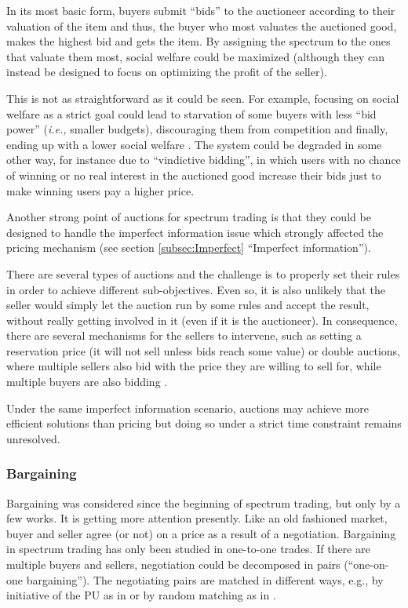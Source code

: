In its most basic form, buyers submit ``bids'' to the auctioneer according to their valuation of the item and thus, the buyer who most valuates the auctioned good, makes the highest bid and gets the item. By assigning the spectrum to the ones that valuate them most, social welfare could be maximized (although they can instead be designed to focus on optimizing the profit of the seller). 

This is not as straightforward as it could be seen. For example, focusing on social welfare as a strict goal could lead to starvation of some buyers with less ``bid power'' (\textit{i.e.,} smaller budgets), discouraging them from competition and finally, ending up with a lower social welfare \cite{ref:Gopinathan2011}. The system could be degraded in some other way, for instance due to ``vindictive bidding'', in which users with no chance of winning or no real interest in the auctioned good increase their bids just to make winning users pay a higher price. 

Another strong point of auctions for spectrum trading is that they could be designed to handle the imperfect information issue which strongly affected the pricing mechanism (see section \ref{subsec:Imperfect} ``Imperfect information'').

There are several types of auctions and the challenge is to properly set their rules in order to achieve different sub-objectives. Even so, it is also unlikely that the seller would simply let the auction run by some rules and accept the result, without really getting involved in it (even if it is the auctioneer). In consequence, there are several mechanisms for the sellers to intervene, such as setting a reservation price (it will not sell unless bids reach some value) or double auctions, where multiple sellers also bid with the price they are willing to sell for, while multiple buyers are also bidding \cite{ref:Wang2010_TODA,ref:Gao2011_MAP,ref:Xu2010}.

Under the same imperfect information scenario, auctions may achieve more efficient solutions than pricing but doing so under a strict time constraint remains unresolved. 

\subsubsection{Bargaining}

Bargaining was considered since the beginning of spectrum trading, but only by a few works. It is getting more attention presently. Like an old fashioned market, buyer and seller agree (or not) on a price as a result of a negotiation. Bargaining in spectrum trading has only been studied in one-to-one trades. If there are multiple buyers and sellers, negotiation could be decomposed in pairs (``one-on-one bargaining''). The negotiating pairs are matched in different ways, e.g., by initiative of the PU as in \cite{ref:Simeone2008} or by random matching as in \cite{ref:Xu2012}.

